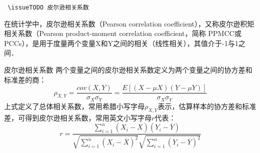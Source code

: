 
\verb | \issueTODO 皮尔逊相关系数|

在统计学中，皮尔逊相关系数（Pearson correlation coefficient），又称皮尔逊积矩相关系数（Pearson product-moment correlation coefficient，简称 PPMCC或PCCs），是用于度量两个变量X和Y之间的相关（线性相关），其值介于-1与1之间．
\begin{definition}{皮尔逊相关系数}\label{PearsR_def1}
两个变量之间的皮尔逊相关系数定义为两个变量之间的协方差和标准差的商：
\begin{equation}
\rho_{X,Y}=\frac{cov(X,Y)}{\sigma_{X}\sigma_{Y}}=\frac{E[(X-\mu X)(Y-\mu Y)]}{\sigma_{X}\sigma_{Y}}
\end{equation}
上式定义了总体相关系数，常用希腊小写字母$\rho_{X,Y}$表示，估算样本的协方差和标准差，可得到皮尔逊相关系数，常用英文小写字母$r$代表：
\begin{equation}
r=\frac{\sum_{i=1}^n\left(X_i-\overline X\right)\left(Y_i-\overline Y\right)}{\sqrt{\sum_{i=1}^n\left(X_i-\overline X\right)^2}\sqrt{\sum_{i=1}^n\left(Y_i-\overline Y\right)^2}}
\end{equation}
\end{definition}